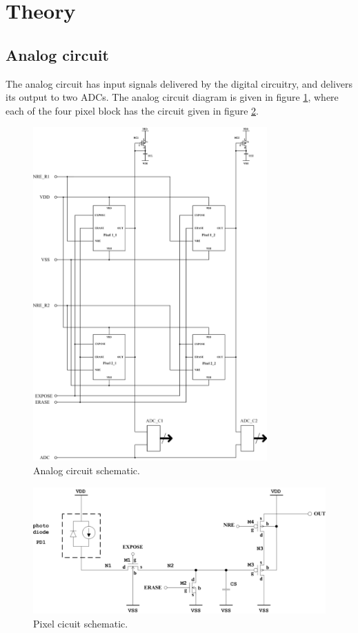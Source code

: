\section{Theory}

\subsection{Analog circuit}
\label{sec:analogCircuit}
The analog circuit has input signals delivered by the digital circuitry, and delivers its output to two ADCs. The analog circuit diagram is given in figure \ref{fig:analogCircuit}, where each of the four pixel block has the circuit given in figure \ref{fig:pixelCircuit}.

\begin{figure}[H]
    \centering
    \includegraphics[width=0.8\textwidth]{graphs/analogCircuit.png}
    \caption{Analog circuit schematic.}
    \label{fig:analogCircuit}
\end{figure}

\begin{figure}[H]
    \centering
    \includegraphics[width=\textwidth]{graphs/pixelCircuit.png}
    \caption{Pixel cicuit schematic.}
    \label{fig:pixelCircuit}
\end{figure}

